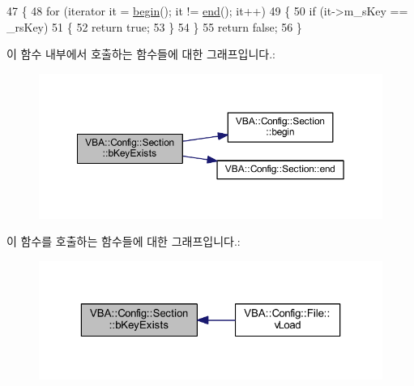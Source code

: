 \begin{DoxyCode}
47 \{
48   \textcolor{keywordflow}{for} (iterator it = \mbox{\hyperlink{class_v_b_a_1_1_config_1_1_section_ac345183b43a45fd3eeaa646eac631390}{begin}}(); it != \mbox{\hyperlink{class_v_b_a_1_1_config_1_1_section_a15ff15ecb9f7f3aa0bb1c218d47f8829}{end}}(); it++)
49   \{
50     \textcolor{keywordflow}{if} (it->m\_sKey == \_rsKey)
51     \{
52       \textcolor{keywordflow}{return} \textcolor{keyword}{true};
53     \}
54   \}
55   \textcolor{keywordflow}{return} \textcolor{keyword}{false};
56 \}
\end{DoxyCode}
이 함수 내부에서 호출하는 함수들에 대한 그래프입니다.\+:
\nopagebreak
\begin{figure}[H]
\begin{center}
\leavevmode
\includegraphics[width=350pt]{class_v_b_a_1_1_config_1_1_section_a2c189e6a7e47e3c13a4e3eb6aa7f477e_cgraph}
\end{center}
\end{figure}
이 함수를 호출하는 함수들에 대한 그래프입니다.\+:
\nopagebreak
\begin{figure}[H]
\begin{center}
\leavevmode
\includegraphics[width=323pt]{class_v_b_a_1_1_config_1_1_section_a2c189e6a7e47e3c13a4e3eb6aa7f477e_icgraph}
\end{center}
\end{figure}
\mbox{\label{class_v_b_a_1_1_config_1_1_section_a15ff15ecb9f7f3aa0bb1c218d47f8829}} 
